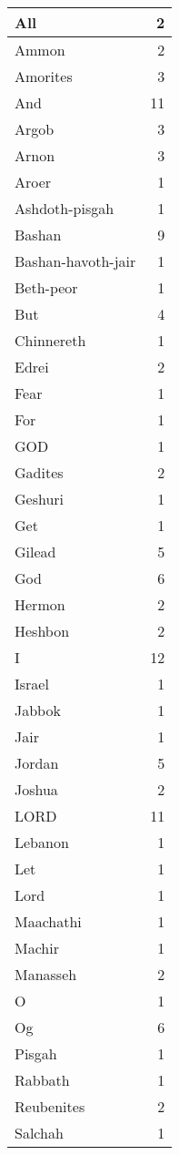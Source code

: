 \begin{center}
\begin{longtable}{l|r}
\hline \hline
\endlastfoot
All & 2 \\ \hline
Ammon & 2 \\ \hline
Amorites & 3 \\ \hline
And & 11 \\ \hline
Argob & 3 \\ \hline
Arnon & 3 \\ \hline
Aroer & 1 \\ \hline
Ashdoth-pisgah & 1 \\ \hline
Bashan & 9 \\ \hline
Bashan-havoth-jair & 1 \\ \hline
Beth-peor & 1 \\ \hline
But & 4 \\ \hline
Chinnereth & 1 \\ \hline
Edrei & 2 \\ \hline
Fear & 1 \\ \hline
For & 1 \\ \hline
GOD & 1 \\ \hline
Gadites & 2 \\ \hline
Geshuri & 1 \\ \hline
Get & 1 \\ \hline
Gilead & 5 \\ \hline
God & 6 \\ \hline
Hermon & 2 \\ \hline
Heshbon & 2 \\ \hline
I & 12 \\ \hline
Israel & 1 \\ \hline
Jabbok & 1 \\ \hline
Jair & 1 \\ \hline
Jordan & 5 \\ \hline
Joshua & 2 \\ \hline
LORD & 11 \\ \hline
Lebanon & 1 \\ \hline
Let & 1 \\ \hline
Lord & 1 \\ \hline
Maachathi & 1 \\ \hline
Machir & 1 \\ \hline
Manasseh & 2 \\ \hline
O & 1 \\ \hline
Og & 6 \\ \hline
Pisgah & 1 \\ \hline
Rabbath & 1 \\ \hline
Reubenites & 2 \\ \hline
Salchah & 1 \\ \hline

\end{longtable}
\end{center}
